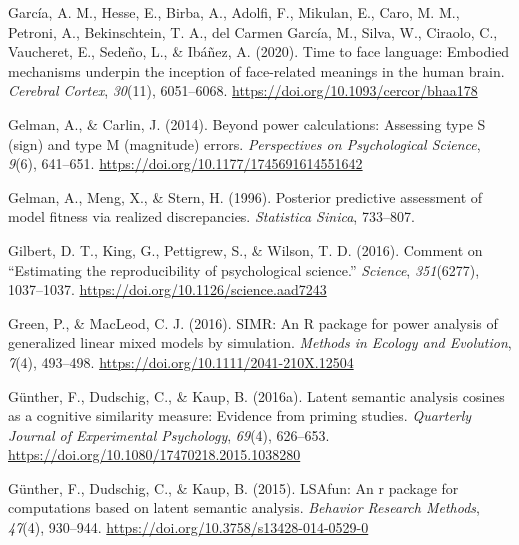 \documentclass[
  12pt,
  man,floatsintext]{apa7}
\newlength{\cslhangindent}
\newlength{\cslentryspacingunit} %
\newenvironment{CSLReferences}[2] %
 {%
  \setlength{\parindent}{0pt}
  \ifodd #1
  \let\oldpar\par
  \def\par{\hangindent=\cslhangindent\oldpar}
  \fi
  \setlength{\parskip}{#2\cslentryspacingunit}
 }%
 {}
\begin{document}
\begin{CSLReferences}{1}{0}
\leavevmode{}%
García, A. M., Hesse, E., Birba, A., Adolfi, F., Mikulan, E., Caro, M. M., Petroni, A., Bekinschtein, T. A., del Carmen García, M., Silva, W., Ciraolo, C., Vaucheret, E., Sedeño, L., \& Ibáñez, A. (2020). Time to face language: Embodied mechanisms underpin the inception of face-related meanings in the human brain. \emph{Cerebral Cortex}, \emph{30}(11), 6051--6068. \url{https://doi.org/10.1093/cercor/bhaa178}

\leavevmode{}%
Gelman, A., \& Carlin, J. (2014). Beyond power calculations: Assessing type {S} (sign) and type {M} (magnitude) errors. \emph{Perspectives on Psychological Science}, \emph{9}(6), 641--651. \url{https://doi.org/10.1177/1745691614551642}

\leavevmode{}%
Gelman, A., Meng, X., \& Stern, H. (1996). Posterior predictive assessment of model fitness via realized discrepancies. \emph{Statistica Sinica}, 733--807.

\leavevmode{}%
Gilbert, D. T., King, G., Pettigrew, S., \& Wilson, T. D. (2016). Comment on {``{Estimating} the reproducibility of psychological science.''} \emph{Science}, \emph{351}(6277), 1037--1037. \url{https://doi.org/10.1126/science.aad7243}

\leavevmode{}%
Green, P., \& MacLeod, C. J. (2016). {SIMR}: {An R} package for power analysis of generalized linear mixed models by simulation. \emph{Methods in Ecology and Evolution}, \emph{7}(4), 493--498. \url{https://doi.org/10.1111/2041-210X.12504}

\leavevmode{}%
Günther, F., Dudschig, C., \& Kaup, B. (2016a). Latent semantic analysis cosines as a cognitive similarity measure: {Evidence} from priming studies. \emph{Quarterly Journal of Experimental Psychology}, \emph{69}(4), 626--653. \url{https://doi.org/10.1080/17470218.2015.1038280}

\leavevmode{}%
Günther, F., Dudschig, C., \& Kaup, B. (2015). LSAfun: An r package for computations based on latent semantic analysis. \emph{Behavior Research Methods}, \emph{47}(4), 930--944. \url{https://doi.org/10.3758/s13428-014-0529-0}


\end{CSLReferences}
\end{document}
